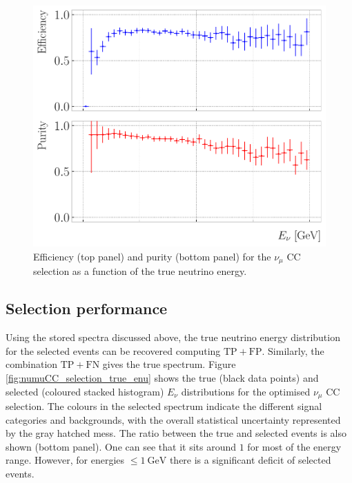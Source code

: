 \begin{figure}[t]
	\centering
	\includegraphics[width=.70\linewidth]{Images/GAr_selection/numuCC_selection_true_energy_performance.pdf}
	\caption[Efficiency and purity for the $\nu_{\mu}$ CC selection as a function of the true neutrino energy.]{Efficiency (top panel) and purity (bottom panel) for the $\nu_{\mu}$ CC selection as a function of the true neutrino energy.}
	\label{fig:numuCC_selection_true_enu_performance}
\end{figure}

\subsection{Selection performance}

Using the stored spectra discussed above, the true neutrino energy distribution for the selected events can be recovered computing $\mathrm{TP}+\mathrm{FP}$. Similarly, the combination $\mathrm{TP}+\mathrm{FN}$ gives the true spectrum. Figure \ref{fig:numuCC_selection_true_enu} shows the true (black data points) and selected (coloured stacked histogram) $E_{\nu}$ distributions for the optimised $\nu_{\mu}$ CC selection. The colours in the selected spectrum indicate the different signal categories and backgrounds, with the overall statistical uncertainty represented by the gray hatched mess. The ratio between the true and selected events is also shown (bottom panel). One can see that it sits around $1$ for most of the energy range. However, for energies $\leq 1~\mathrm{GeV}$ there is a significant deficit of selected events.

